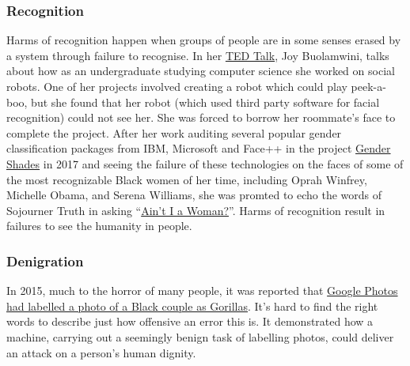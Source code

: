 \subsubsection*{Recognition}

Harms of recognition happen when groups of people are in some senses erased by a system through failure to recognise. In her \href{https://www.ted.com/talks/joy_buolamwini_how_i_m_fighting_bias_in_algorithms/transcript?language=en}{TED Talk}, Joy Buolamwini, talks about how as an undergraduate studying computer science she worked on social robots. One of her projects involved creating a robot which could play peek-a-boo, but she found that her robot (which used third party software for facial recognition) could not see her. She was forced to borrow her roommate's face to complete the project. After her work auditing several popular gender classification packages from IBM, Microsoft and Face++ in the project \href{http://gendershades.org/overview.html}{Gender Shades}\cite{GenderShades} in 2017 and seeing the failure of these technologies on the faces of some of the most recognizable Black women of her time, including Oprah Winfrey, Michelle Obama, and Serena Williams, she was promted to echo the words of Sojourner Truth in asking ``\href{https://medium.com/@Joy.Buolamwini/when-ai-fails-on-oprah-serena-williams-and-michelle-obama-its-time-to-face-truth-bf7c2c8a4119}{Ain't I a Woman?}''. Harms of recognition result in failures to see the humanity in people.

\subsubsection*{Denigration}

In 2015, much to the horror of many people, it was reported that \href{https://www.bbc.com/news/technology-33347866}{Google Photos had labelled a photo of a Black couple as Gorillas}. It's hard to find the right words to describe just how offensive an error this is. It demonstrated how a machine, carrying out a seemingly benign task of labelling photos, could deliver an attack on a person's human dignity.

